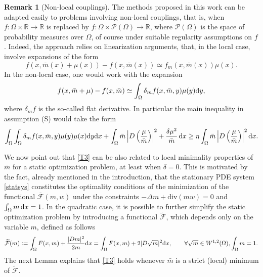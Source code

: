 \documentclass[10pt,a4paper,nouppercase,nowrite]{article}
\numberwithin{equation}{section}
\newcommand{\di}{{\rm d}}
\newcommand{\Sp}{{\textsc (S)} }
\newcommand{\R}{\mathbb{R}}
\theoremstyle{definition}
\newtheorem{rmk}[defn]{Remark}
\begin{document}
\begin{rmk}[Non-local couplings]\label{nonlocrem} The methods proposed in this work can be adapted easily to problems involving non-local couplings, that is, when $f : \Omega \times \R \to \R$ is replaced by $f : \Omega \times \mathcal P (\Omega) \to \R$, where $\mathcal P (\Omega)$ is the space of probability measures over $\Omega$, of course under suitable regularity assumptions on $f$. Indeed, the approach relies on linearization arguments, that, in the local case, involve expansions of the form
\[
f(x, \bar{m}(x)+\mu(x)) - f(x,\bar{m}(x)) \simeq f_m(x,\bar m(x)) \mu(x) .
\]
In the non-local case, one would work with the expansion
\[
f(x, \bar{m}+\mu) - f(x,\bar{m}) \simeq \int_\Omega \delta_m f(x,\bar m,y) \mu(y) \di y,
\]
where $\delta_m f$ is the so-called flat derivative. In particular the main inequality in assumption \Sp would take the form
\[
	\int_{\Omega}\int_{\Omega} \delta_m f(x,\bar{m},y) \mu(y) \mu(x) \di y \di x +  \int_{\Omega} \bar m\left| D \left( \frac{\mu}{\bar{m}} \right) \right|^2 + \frac{\delta \mu^2}{\bar{m}} \, \di x \geq \eta \int_{\Omega} \bar m\left| D \left( \frac{\mu}{\bar{m}} \right) \right|^2 \di x.
\]
\end{rmk}

We now point out that \eqref{T3} can be also related to local minimality properties of $\bar m$ for a static optimization problem, at least when $\delta = 0$. This is motivated by the fact, already mentioned in the introduction, that the stationary PDE system \eqref{statsys} constitutes the optimality conditions of the minimization of the functional $\overline{\mathcal{F}}(m,w)$ under the constraints $-\Delta m + \text{div}(m w)=0$ and $\int_{\Omega} m \, \di x=1$. In the quadratic case, it is possible to further simplify the static optimization problem by introducing a functional $\widetilde{\mathcal{F}}$, which depends only on the variable $m$, defined as follows
\begin{equation*}
	\widetilde{\mathcal{F}}(m):=\int_{\Omega} F(x,m) + \frac{|Dm|^2}{2m} \di x = \int_{\Omega} F(x,m) + 2 |D\sqrt{m}|^2 \di x, \qquad \forall \sqrt{m} \in W^{1,2}(\Omega), \int_{\Omega} m =1.
\end{equation*}
The next Lemma explains that \eqref{T3} holds whenever $\bar m$ is a strict (local) minimum of $\widetilde{\mathcal{F}}$.
\end{document}
